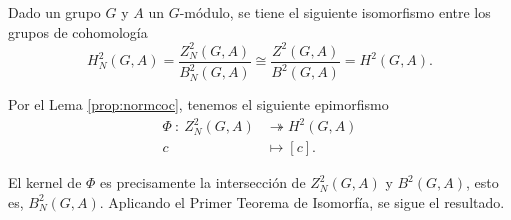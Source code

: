 \begin{teorema}\label{thm:h2hn2}
	Dado un grupo $G$ y $A$ un $G$-módulo, se tiene el siguiente isomorfismo entre los grupos de cohomología
	\begin{equation}
		H^2_N(G,A) = \frac{Z^2_N(G,A)}{B^2_N(G,A)} \cong \frac{Z^2(G,A)}{B^2(G,A)} = H^2(G,A).
	\end{equation}
	\begin{demostracion}
		Por el Lema \ref{prop:normcoc}, tenemos el siguiente epimorfismo
		\begin{align*}
			\Phi \ \colon \ Z^2_N(G,A) &\twoheadrightarrow H^2(G,A) \\
			c \ &\mapsto [c].
		\end{align*}
		
		El kernel de $\Phi$ es precisamente la intersección de $Z^2_N(G,A)$ y $B^2(G,A)$, esto es, $B^2_N(G,A)$. Aplicando el Primer Teorema de Isomorfía, se sigue el resultado.
	\end{demostracion}
\end{teorema}

